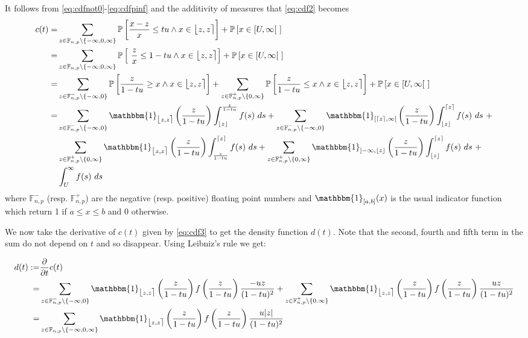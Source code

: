 \documentclass[10pt,a4paper]{article}
\theoremstyle{plain}
\theoremstyle{definition}
\newcommand{\F}[1][n,p]{\mathbb{F}_{#1}}
\newcommand{\one}{\mathbbm{1}}
\newcommand{\ceil}[1]{\lceil #1 \rceil}
\newcommand{\floor}[1]{\lfloor #1 \rfloor}
\newcommand{\fintvl}[1][x]{\mathlarger{\lfloor}#1,#1\mathlarger{\rceil}}
\newcommand{\absv}[1]{\vert #1\vert}
\newcommand{\Pro}[1]{\mathbb{P}\left[ #1 \right]}
\newcommand{\dt}{\frac{\partial}{\partial t}}
\begin{document}
It follows from \eqref{eq:cdfnot0}-\eqref{eq:cdfpinf} and the additivity of measures that \eqref{eq:cdf2} becomes
\begin{align}
c(t)=&\sum_{z\in\F\setminus\{-\infty,0,\infty\}}\Pro{\frac{x-z}{x}\leq tu\wedge x\in \fintvl[z]}+\Pro{x\in [U,\infty[~}\nonumber
\\
=&\sum_{z\in\F\setminus\{-\infty,0,\infty\}}\Pro{~\frac{z}{x}\leq 1-tu\wedge x\in \fintvl[z]}+\Pro{x\in [U,\infty[~} \nonumber
\\
=&\sum_{z\in\F^-\setminus\{-\infty,0\}}\Pro{\frac{z}{1-tu}\geq x\wedge x\in \fintvl[z]}+\sum_{z\in\F^+\setminus\{0,\infty\}}\Pro{\frac{z}{1-tu}\leq x \wedge x\in \fintvl[z]}+\Pro{x\in [U,\infty[~} \nonumber 
\\
=&\sum_{z\in\F^-\setminus\{-\infty,0\}}\one_{\fintvl[z]}\left(\frac{z}{1-tu}\right) \int^{\frac{z}{1-tu}}_{\floor{z}} f(s)~ds+ \sum_{z\in\F^-\setminus\{-\infty,0\}}\one_{[\ceil{z},\infty[}\left(\frac{z}{1-tu}\right) \int^{\ceil{z}}_{\floor{z}} f(s)~ds~+ \nonumber 
\\
&\sum_{z\in\F^+\setminus\{0,\infty\}}\one_{\fintvl[z]}\left(\frac{z}{1-tu}\right) \int^{\ceil{z}}_{\frac{z}{1-tu}} f(s)~ds+\sum_{z\in\F^+\setminus\{0,\infty\}}\one_{]-\infty,\floor{z}}\left(\frac{z}{1-tu}\right) \int_{\floor{z}}^{\ceil{z}} f(s)~ds~+
\nonumber \\
&\int_U^\infty f(s)~ds \label{eq:cdf3}
\end{align}
where $\F^-$ (resp. $\F^+$) are the negative (resp. positive) floating point numbers and $\one_{[a,b]}(x)$ is the usual indicator function which return 1 if $a\leq x\leq b$ and 0 otherwise.




We now take the derivative of $c(t)$ given by \eqref{eq:cdf3} to get the density function $d(t)$. Note that the second, fourth and fifth term in the sum do not depend on $t$ and so disappear. Using Leibniz's rule we get:

\begin{align}
d(t):=&\dt c(t)\nonumber \\
=& \sum_{z\in\F^-\setminus\{-\infty,0\}}\one_{\fintvl[z]}\left(\frac{z}{1-tu}\right) f\left(\frac{z}{1-tu}\right) \frac{-uz}{(1-tu)^2}+\sum_{z\in\F^+\setminus\{0.\infty\}}\one_{\fintvl[z]}\left(\frac{z}{1-tu}\right) f\left(\frac{z}{1-tu}\right) \frac{uz}{(1-tu)^2}\nonumber \\
=&\sum_{z\in\F\setminus\{-\infty,0,\infty\}}\one_{\fintvl[z]}\left(\frac{z}{1-tu}\right) f\left(\frac{z}{1-tu}\right) \frac{u\absv{z}}{(1-tu)^2}
\label{eq:pdf}
\end{align}
\end{document}
